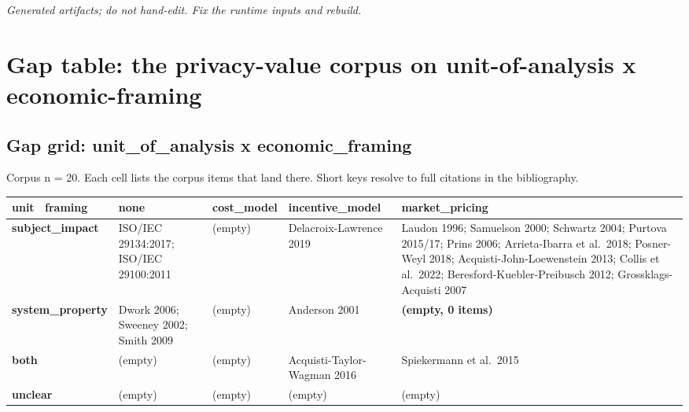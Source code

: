 \documentclass[
  11pt,
]{article}
\newcounter{none} %
\begin{document}
\emph{Generated artifacts; do not hand-edit. Fix the runtime inputs and
rebuild.}

\newpage

\section{Gap table: the privacy-value corpus on unit-of-analysis x
economic-framing}\label{gap-table-the-privacy-value-corpus-on-unit-of-analysis-x-economic-framing}

\subsection{Gap grid: unit\_of\_analysis x
economic\_framing}\label{gap-grid-unit_of_analysis-x-economic_framing}

Corpus n = 20. Each cell lists the corpus items that land there. Short
keys resolve to full citations in the bibliography.

{\def\LTcaptype{none} %
\begin{longtable}[]{@{}
  >{\raggedright\arraybackslash}p{}
  >{\raggedright\arraybackslash}p{}
  >{\raggedright\arraybackslash}p{}
  >{\raggedright\arraybackslash}p{}
  >{\raggedright\arraybackslash}p{}@{}}
\toprule\noalign{}
\begin{minipage}[b]{\linewidth}\raggedright
unit ~framing
\end{minipage} & \begin{minipage}[b]{\linewidth}\raggedright
none
\end{minipage} & \begin{minipage}[b]{\linewidth}\raggedright
cost\_model
\end{minipage} & \begin{minipage}[b]{\linewidth}\raggedright
incentive\_model
\end{minipage} & \begin{minipage}[b]{\linewidth}\raggedright
market\_pricing
\end{minipage} \\
\midrule\noalign{}
\endhead
\bottomrule\noalign{}
\endlastfoot
\textbf{subject\_impact} & ISO/IEC 29134:2017; ISO/IEC 29100:2011 &
(empty) & Delacroix-Lawrence 2019 & Laudon 1996; Samuelson 2000;
Schwartz 2004; Purtova 2015/17; Prins 2006; Arrieta-Ibarra et al.~2018;
Posner-Weyl 2018; Acquisti-John-Loewenstein 2013; Collis et al.~2022;
Beresford-Kuebler-Preibusch 2012; Grossklags-Acquisti 2007 \\
\textbf{system\_property} & Dwork 2006; Sweeney 2002; Smith 2009 &
(empty) & Anderson 2001 & \textbf{(empty, 0 items)} \\
\textbf{both} & (empty) & (empty) & Acquisti-Taylor-Wagman 2016 &
Spiekermann et al.~2015 \\
\textbf{unclear} & (empty) & (empty) & (empty) & (empty) \\
\end{longtable}
}
\end{document}
